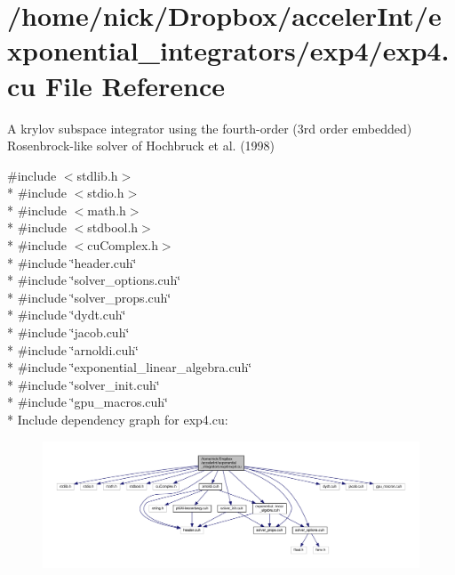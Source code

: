 \hypertarget{exp4_8cu}{}\section{/home/nick/\+Dropbox/acceler\+Int/exponential\+\_\+integrators/exp4/exp4.cu File Reference}
\label{exp4_8cu}


A krylov subspace integrator using the fourth-\/order (3rd order embedded) Rosenbrock-\/like solver of Hochbruck et al. (1998)  


{\ttfamily \#include $<$stdlib.\+h$>$}\\*
{\ttfamily \#include $<$stdio.\+h$>$}\\*
{\ttfamily \#include $<$math.\+h$>$}\\*
{\ttfamily \#include $<$stdbool.\+h$>$}\\*
{\ttfamily \#include $<$cu\+Complex.\+h$>$}\\*
{\ttfamily \#include \char`\"{}header.\+cuh\char`\"{}}\\*
{\ttfamily \#include \char`\"{}solver\+\_\+options.\+cuh\char`\"{}}\\*
{\ttfamily \#include \char`\"{}solver\+\_\+props.\+cuh\char`\"{}}\\*
{\ttfamily \#include \char`\"{}dydt.\+cuh\char`\"{}}\\*
{\ttfamily \#include \char`\"{}jacob.\+cuh\char`\"{}}\\*
{\ttfamily \#include \char`\"{}arnoldi.\+cuh\char`\"{}}\\*
{\ttfamily \#include \char`\"{}exponential\+\_\+linear\+\_\+algebra.\+cuh\char`\"{}}\\*
{\ttfamily \#include \char`\"{}solver\+\_\+init.\+cuh\char`\"{}}\\*
{\ttfamily \#include \char`\"{}gpu\+\_\+macros.\+cuh\char`\"{}}\\*
Include dependency graph for exp4.\+cu\+:
\nopagebreak
\begin{figure}[H]
\begin{center}
\leavevmode
\includegraphics[width=350pt]{exp4_8cu__incl}
\end{center}
\end{figure}
